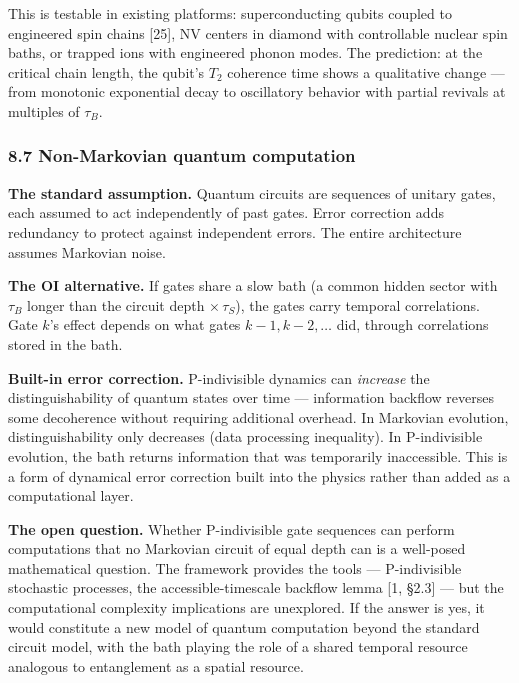 \documentclass[
]{article}
\begin{document}
This is testable in existing platforms: superconducting qubits coupled
to engineered spin chains {[}25{]}, NV centers in diamond with
controllable nuclear spin baths, or trapped ions with engineered phonon
modes. The prediction: at the critical chain length, the qubit's \(T_2\)
coherence time shows a qualitative change --- from monotonic exponential
decay to oscillatory behavior with partial revivals at multiples of
\(\tau_B\).

\hypertarget{non-markovian-quantum-computation}{%
\subsubsection{8.7 Non-Markovian quantum
computation}\label{non-markovian-quantum-computation}}

\textbf{The standard assumption.} Quantum circuits are sequences of
unitary gates, each assumed to act independently of past gates. Error
correction adds redundancy to protect against independent errors. The
entire architecture assumes Markovian noise.

\textbf{The OI alternative.} If gates share a slow bath (a common hidden
sector with \(\tau_B\) longer than the circuit depth
\(\times \, \tau_S\)), the gates carry temporal correlations. Gate
\(k\)'s effect depends on what gates \(k-1, k-2, \ldots\) did, through
correlations stored in the bath.

\textbf{Built-in error correction.} P-indivisible dynamics can
\emph{increase} the distinguishability of quantum states over time ---
information backflow reverses some decoherence without requiring
additional overhead. In Markovian evolution, distinguishability only
decreases (data processing inequality). In P-indivisible evolution, the
bath returns information that was temporarily inaccessible. This is a
form of dynamical error correction built into the physics rather than
added as a computational layer.

\textbf{The open question.} Whether P-indivisible gate sequences can
perform computations that no Markovian circuit of equal depth can is a
well-posed mathematical question. The framework provides the tools ---
P-indivisible stochastic processes, the accessible-timescale backflow
lemma {[}1, §2.3{]} --- but the computational complexity implications
are unexplored. If the answer is yes, it would constitute a new model of
quantum computation beyond the standard circuit model, with the bath
playing the role of a shared temporal resource analogous to entanglement
as a spatial resource.
\end{document}

